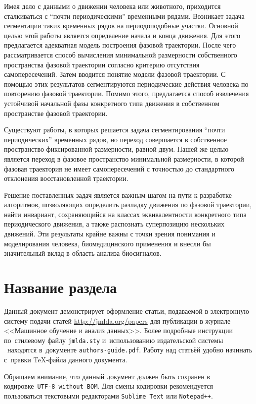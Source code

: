 \documentclass[12pt, twoside]{article}
\begin{document}
Имея дело с данными о движении человека или животного, приходится сталкиваться с “почти периодическими” временными рядами. Возникает задача сегментации таких временных рядов на периодоподобные участки. Основной целью этой работы является определение начала и конца движения. Для этого предлагается адекватная модель построения фазовой траектории. После чего рассматривается способ вычисления минимальной размерности собственного пространства фазовой траектории согласно критерию отсутствия самопересечений. Затем вводится понятие модели фазовой траектории. С помощью этих результатов сегментируются периодические действия человека по повторению фазовой траектории. Помимо этого, предлагается способ извлечения устойчивой начальной фазы конкретного типа движения в собственном пространстве фазовой траектории.

Существуют работы, в которых решается задача сегментирования “почти периодических” временных рядов, но переход совершается в собственное пространство фиксированной размерности, равной двум. Нашей же целью является переход в фазовое пространство минимальной размерности, в которой фазовая траектория не имеет самопересечений с точностью до стандартного отклонения восстановленной траектории.

Решение поставленных задач является важным шагом на пути к разработке алгоритмов, позволяющих определить разладку движения по фазовой траектории, найти инвариант, сохраняющийся на классах эквивалентности конкретного типа периодического движения, а также распознать суперпозицию нескольких движений. Эти результаты крайне важны с точки зрения понимания и моделирования человека, биомедицинского применения и внесли бы значительный вклад в область анализа биосигналов.

\section{Название раздела}
Данный документ демонстрирует оформление статьи,
подаваемой в электронную систему подачи статей \url{http://jmlda.org/papers} для публикации в журнале <<Машинное обучение и анализ данных>>.
Более подробные инструкции по~стилевому файлу \texttt{jmlda.sty} и~использованию издательской системы \LaTeXe\
находятся в~документе \texttt{authors-guide.pdf}.
Работу над статьёй удобно начинать с~правки \TeX-файла данного документа.

Обращаем внимание, что данный документ должен быть сохранен в кодировке~\verb'UTF-8 without BOM'.
Для смены кодировки рекомендуется пользоваться текстовыми редакторами \verb'Sublime Text' или \verb'Notepad++'.
\end{document}
